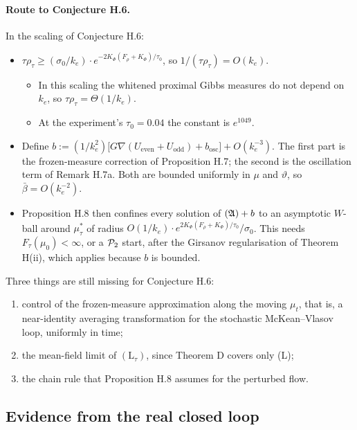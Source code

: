 \paragraph{Route to Conjecture H.6.} In the scaling of Conjecture H.6:
\begin{itemize}
  \item $\tau\rho_\tau\ge(\sigma_0/k_e)\cdot e^{-2K_\Phi(F_\rho+K_\Phi)/\tau_0}$, so $1/(\tau\rho_\tau) = O(k_e)$.
    \begin{itemize}
      \item In this scaling the whitened proximal Gibbs measures do not depend on $k_e$, so
        $\tau\rho_\tau=\Theta(1/k_e)$.
      \item At the experiment's $\tau_0=0.04$ the constant is $e^{1049}$.
    \end{itemize}
  \item Define $b := (1/k_e^2)\bigl[G\nabla(U_{\mathrm{even}}+U_{\mathrm{odd}}) + b_{\mathrm{osc}}\bigr] + O(k_e^{-3})$.
    The first part is the frozen-measure correction of Proposition H.7; the second is the oscillation term of Remark
    H.7a. Both are bounded uniformly in $\mu$ and $\vartheta$, so $\bar\beta = O(k_e^{-2})$.
  \item Proposition H.8 then confines every solution of $(\mathfrak{A})+b$ to an asymptotic $W$-ball around $\mu^*_\tau$ of
    radius $O(1/k_e)\cdot e^{2K_\Phi(F_\rho+K_\Phi)/\tau_0}/\sigma_0$. This needs $F_\tau(\mu_0)<\infty$, or a
    $\mathcal{P}_2$ start, after the Girsanov regularisation of Theorem H(ii), which applies because $b$ is bounded.
\end{itemize}

Three things are still missing for Conjecture H.6:
\begin{enumerate}[label=\arabic*.]
  \item control of the frozen-measure approximation along the moving $\mu_t$, that is, a near-identity averaging
    transformation for the stochastic McKean--Vlasov loop, uniformly in time;
  \item the mean-field limit of $(\mathrm{L}_\tau)$, since Theorem D covers only (L);
  \item the chain rule that Proposition H.8 assumes for the perturbed flow.
\end{enumerate}

\subsection{Evidence from the real closed loop}

